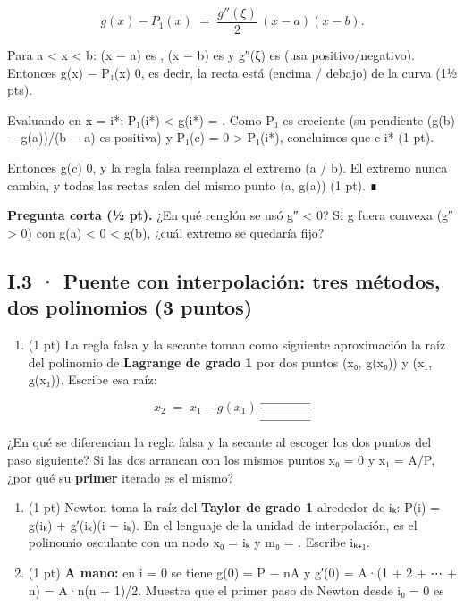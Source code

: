\[g(x) - P_1(x) \;=\; \frac{g''(\xi)}{2}\,(x-a)(x-b).\]

Para a \textless{} x \textless{} b: (x − a) es  , (x − b) es  y g″(ξ) es  (usa positivo/negativo). Entonces g(x) − P₁(x)  0, es decir, la recta está  (encima / debajo) de la curva (1½ pts).

Evaluando en x = i*: P₁(i*) \textless{} g(i*) =  . Como P₁ es creciente (su pendiente (g(b) − g(a))/(b − a) es positiva) y P₁(c) = 0 \textgreater{} P₁(i*), concluimos que c  i* (1 pt).

Entonces g(c)  0, y la regla falsa reemplaza el extremo  (a / b). El extremo  nunca cambia, y todas las rectas salen del mismo punto (a, g(a)) (1 pt). ∎

\textbf{Pregunta corta (½ pt).} ¿En qué renglón se usó g″ \textless{} 0? Si g fuera convexa (g″ \textgreater{} 0) con g(a) \textless{} 0 \textless{} g(b), ¿cuál extremo se quedaría fijo?


\subsection{I.3 · Puente con interpolación: tres métodos, dos polinomios (3 puntos)}

\begin{enumerate}
\def\labelenumi{\alph{enumi})}
\tightlist
\item
  (1 pt) La regla falsa y la secante toman como siguiente aproximación la raíz del polinomio de \textbf{Lagrange de grado 1} por dos puntos (x₀, g(x₀)) y (x₁, g(x₁)). Escribe esa raíz:
\end{enumerate}

\[x_2 \;=\; x_1 - g(x_1)\,\frac{\_\_\_\_\_\_\_\_\_\_\_\_}{\_\_\_\_\_\_\_\_\_\_\_\_}\]

¿En qué se diferencian la regla falsa y la secante al escoger los dos puntos del paso siguiente? Si las dos arrancan con los mismos puntos x₀ = 0 y x₁ = A/P, ¿por qué su \textbf{primer} iterado es el mismo?

\begin{enumerate}
\def\labelenumi{\alph{enumi})}
\setcounter{enumi}{1}
\item
  (1 pt) Newton toma la raíz del \textbf{Taylor de grado 1} alrededor de iₖ: P(i) = g(iₖ) + g′(iₖ)(i − iₖ). En el lenguaje de la unidad de interpolación, es el polinomio osculante con un nodo x₀ = iₖ y m₀ =  . Escribe iₖ₊₁.
\item
  (1 pt) \textbf{A mano:} en i = 0 se tiene g(0) = P − nA y g′(0) = A·(1 + 2 + ⋯ + n) = A·n(n + 1)/2. Muestra que el primer paso de Newton desde i₀ = 0 es
\end{enumerate}

